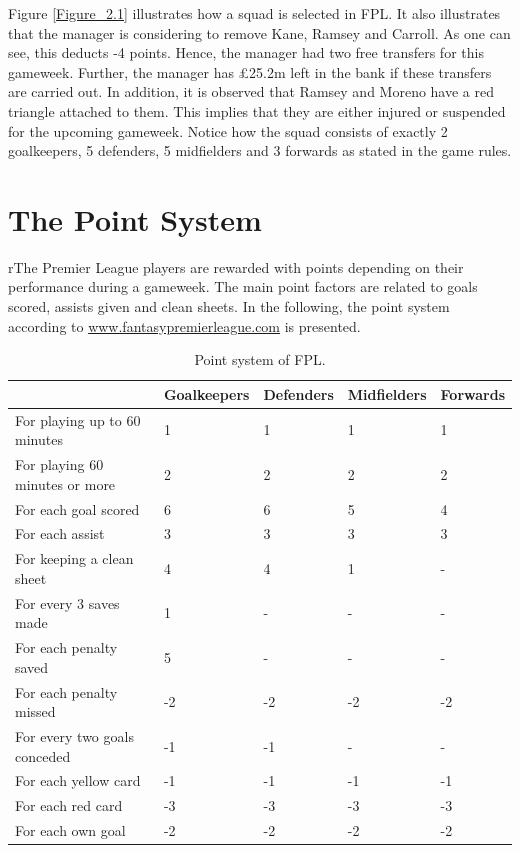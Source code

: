 Figure \ref{Figure_2.1} illustrates how a squad is selected in FPL. It also illustrates that the manager is considering to remove Kane, Ramsey and Carroll. As one can see, this deducts -4 points. Hence, the manager had two free transfers for this gameweek. Further, the manager has \pounds 25.2m left in the bank if these transfers are carried out. In addition, it is observed that Ramsey and Moreno have a red triangle attached to them. This implies that they are either injured or suspended for the upcoming gameweek. Notice how the squad consists of exactly 2 goalkeepers, 5 defenders, 5 midfielders and 3 forwards as stated in the game rules. 


\section{The Point System} \label{point_system}
rThe Premier League players are rewarded with points depending on their performance during a gameweek. The main point factors are related to goals scored, assists given and clean sheets. In the following, the point system according to \url{www.fantasypremierleague.com} is presented. 

\begin{table}[H]
\centering
\small
\begin{tabular}{|l|l|l|l|l|}
\hline
                               & Goalkeepers & Defenders & Midfielders & Forwards \\
\hline
For playing up to 60 minutes   & 1           & 1         & 1           & 1        \\
For playing 60 minutes or more & 2           & 2         & 2           & 2        \\
For each goal scored           & 6           & 6         & 5           & 4        \\
For each assist                & 3           & 3         & 3           & 3        \\
For keeping a clean sheet      & 4           & 4         & 1           & -        \\
For every 3 saves made         & 1           & -         & -           & -        \\
For each penalty saved         & 5           & -         & -           & -        \\
For each penalty missed        & -2          & -2        & -2          & -2       \\
For every two goals conceded   & -1          & -1        & -           & -        \\
For each yellow card           & -1          & -1        & -1          & -1       \\
For each red card              & -3          & -3        & -3          & -3       \\
For each own goal              & -2          & -2        & -2          & -2      \\
\hline
\end{tabular}
\caption{Point system of FPL.}
\end{table}

